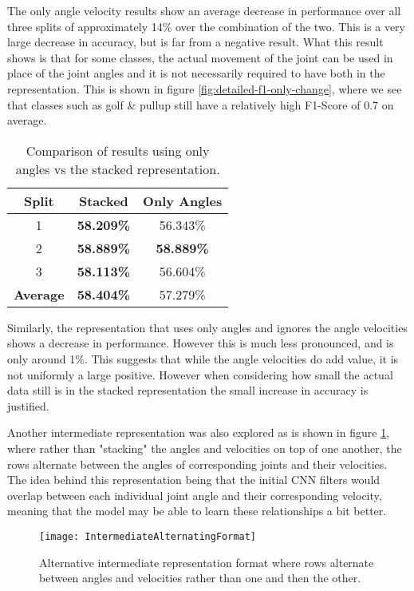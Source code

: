 The only angle velocity results show an average decrease in performance over all three splits of approximately 14\% over the combination of the two. This is a very large decrease in accuracy, but is far from a negative result. What this result shows is that for some classes, the actual movement of the joint can be used in place of the joint angles and it is not necessarily required to have both in the representation. This is shown in figure \ref{fig:detailed-f1-only-change}, where we see that classes such as golf \& pullup still have a relatively high F1-Score of 0.7 on average.

\begin{table}[ht]
	\centering
	\begin{tabular}{||c c c||} 
		\hline
		\textbf{Split} & \textbf{Stacked} & \textbf{Only Angles} \\ [0.5ex] 
		\hline\hline
		1 & \textbf{58.209\%} & 56.343\% \\ 
		\hline
		2 & \textbf{58.889\%} & \textbf{58.889\%} \\
		\hline
		3 & \textbf{58.113\%} & 56.604\% \\
		\hline
		\hline
		\textbf{Average} & \textbf{58.404\%} & 57.279\% \\
		\hline
	\end{tabular}
	\caption{Comparison of results using only angles vs the stacked representation.}
	\label{tab:acc-results-v-angle}
\end{table}

Similarly, the representation that uses only angles and ignores the angle velocities shows a decrease in performance. However this is much less pronounced, and is only around 1\%. This suggests that while the angle velocities do add value, it is not uniformly a large positive. However when considering how small the actual data still is in the stacked representation the small increase in accuracy is justified.

Another intermediate representation was also explored as is shown in figure \ref{fig:alternating-intermediate}, where rather than "stacking" the angles and velocities on top of one another, the rows alternate between the angles of corresponding joints and their velocities. The idea behind this representation being that the initial CNN filters would overlap between each individual joint angle and their corresponding velocity, meaning that the model may be able to learn these relationships a bit better.

\begin{figure}[ht]
	\texttt{[image: IntermediateAlternatingFormat]}
	\centering
	\caption{Alternative intermediate representation format where rows alternate between angles and velocities rather than one and then the other.}
	\label{fig:alternating-intermediate}
\end{figure}

